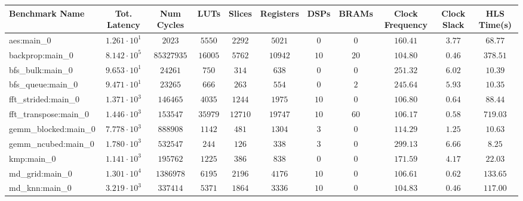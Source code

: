 \begin{tabular}{|l|c|c|c|c|c|c|c|c|c|c|}
\hline
Benchmark Name         & Tot. Latency           & Num Cycles   & LUTs      & Slices    & Registers & DSPs    & BRAMs  & Clock Frequency & Clock Slack & HLS Time(s) \\
\hline
aes:main\_0            & $ 1.261 \cdot 10^{1} $ & $ 2023     $ & $ 5550  $ & $ 2292  $ & $ 5021  $ & $ 0   $ & $ 0  $ & $ 160.41      $ & $ 3.77    $ & $ 68.77   $ \\
backprop:main\_0       & $ 8.142 \cdot 10^{5} $ & $ 85327935 $ & $ 16005 $ & $ 5762  $ & $ 10942 $ & $ 10  $ & $ 20 $ & $ 104.80      $ & $ 0.46    $ & $ 378.51  $ \\
bfs\_bulk:main\_0      & $ 9.653 \cdot 10^{1} $ & $ 24261    $ & $ 750   $ & $ 314   $ & $ 638   $ & $ 0   $ & $ 0  $ & $ 251.32      $ & $ 6.02    $ & $ 10.39   $ \\
bfs\_queue:main\_0     & $ 9.471 \cdot 10^{1} $ & $ 23265    $ & $ 666   $ & $ 263   $ & $ 554   $ & $ 0   $ & $ 2  $ & $ 245.64      $ & $ 5.93    $ & $ 10.35   $ \\
fft\_strided:main\_0   & $ 1.371 \cdot 10^{3} $ & $ 146465   $ & $ 4035  $ & $ 1244  $ & $ 1975  $ & $ 10  $ & $ 0  $ & $ 106.80      $ & $ 0.64    $ & $ 88.44   $ \\
fft\_transpose:main\_0 & $ 1.446 \cdot 10^{3} $ & $ 153547   $ & $ 35979 $ & $ 12710 $ & $ 19747 $ & $ 10  $ & $ 60 $ & $ 106.17      $ & $ 0.58    $ & $ 719.03  $ \\
gemm\_blocked:main\_0  & $ 7.778 \cdot 10^{3} $ & $ 888908   $ & $ 1142  $ & $ 481   $ & $ 1304  $ & $ 3   $ & $ 0  $ & $ 114.29      $ & $ 1.25    $ & $ 10.63   $ \\
gemm\_ncubed:main\_0   & $ 1.780 \cdot 10^{3} $ & $ 532547   $ & $ 244   $ & $ 126   $ & $ 338   $ & $ 3   $ & $ 0  $ & $ 299.13      $ & $ 6.66    $ & $ 8.25    $ \\
kmp:main\_0            & $ 1.141 \cdot 10^{3} $ & $ 195762   $ & $ 1225  $ & $ 386   $ & $ 838   $ & $ 0   $ & $ 0  $ & $ 171.59      $ & $ 4.17    $ & $ 22.03   $ \\
md\_grid:main\_0       & $ 1.301 \cdot 10^{4} $ & $ 1386978  $ & $ 6195  $ & $ 2196  $ & $ 4176  $ & $ 10  $ & $ 0  $ & $ 106.61      $ & $ 0.62    $ & $ 133.65  $ \\
md\_knn:main\_0        & $ 3.219 \cdot 10^{3} $ & $ 337414   $ & $ 5371  $ & $ 1864  $ & $ 3336  $ & $ 10  $ & $ 0  $ & $ 104.83      $ & $ 0.46    $ & $ 117.00  $ \\

\end{tabular}
